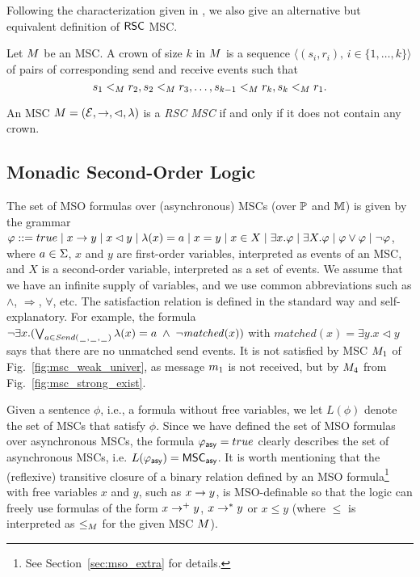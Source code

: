 \medskip

Following the characterization given in \cite[Theorem 4.4]{DBLP:journals/dc/Charron-BostMT96}, we also give an alternative but equivalent definition of $\mathsf{RSC}$ MSC.

\begin{definition}
	Let $M$ be an MSC. A crown of size $k$ in $M$ is a sequence $\langle(s_i,r_i),\, i \in \{1,\dots,k\}\rangle$ of pairs of corresponding send and receive events such that
	\[
		s_1 <_M r_2, s_2 <_M r_3, \dots, s_{k-1} <_M r_k, s_k <_M r_1.
	\]
\end{definition}

\begin{definition} \label{def:rsc_alt}
	An MSC $M = (\mathcal{E},\to,\lhd,\lambda)$ is a \emph{RSC MSC} if and only if it does not contain any crown.
\end{definition}


\subsection{Monadic Second-Order Logic}

The set of MSO formulas over (asynchronous) MSCs (over $\mathbb{P}$ and $\mathbb{M}$) is given by the grammar
$
\varphi ::= true \mid x \to y \mid x \lhd y \mid \lambda(x) = a \mid x = y \mid x \in X \mid \exists x.\varphi \mid \exists X.\varphi \mid \varphi \vee \varphi \mid \neg \varphi
$,
where $a \in \Sigma$, $x$ and $y$ are first-order variables, interpreted as
events of an MSC, and $X$ is a second-order variable, interpreted
as a set of events. We assume that we have an infinite supply of variables,
and we use common abbreviations such as $\wedge$, $\Rightarrow$, $\forall$, etc.
The satisfaction relation is defined in the standard way and self-explanatory.
For example, the formula $\neg\exists x.(\bigvee_{a \in {\mathit{Send}(\hspace{0.1em}\underline{\hspace{0.5em}}\hspace{0.1em},\hspace{0.1em}\underline{\hspace{0.5em}}\hspace{0.1em},\hspace{0.1em}\underline{\hspace{0.5em}}\hspace{0.1em})}} \lambda(x) = a \;\wedge\; \neg \mathit{matched}(x))$
with $\mathit{matched}(x) = \exists y.x \lhd y$
says that there are no unmatched send events.
It is not satisfied by  MSC $M_{1}$
of Fig.~\ref{fig:msc_weak_univer},
as message $m_1$ is not received,
but by $M_{4}$ from Fig.~\ref{fig:msc_strong_exist}.

Given a sentence $\phi$, i.e., a formula without free variables,
we let $L(\phi)$ denote the set of MSCs that satisfy $\phi$. Since we have defined the set of MSO formulas over asynchronous MSCs, the formula $\varphi_{\mathsf{asy}} = true$ clearly describes the set of asynchronous MSCs, i.e. $L(\varphi_{\mathsf{asy}}) = \mathsf{MSC}_{\mathsf{asy}}$. It is worth mentioning that the (reflexive) transitive closure of a binary relation defined by an MSO formula\footnote{See Section~\ref{sec:mso_extra} for details.} with free variables $x$ and $y$, such as $x \to y$, is MSO-definable so that the logic can freely use formulas of the form $x \to^+ y$, $x \to^* y$ or $x \le y$ (where $\le$ is interpreted as $\le_M$ for the given MSC $M$).

